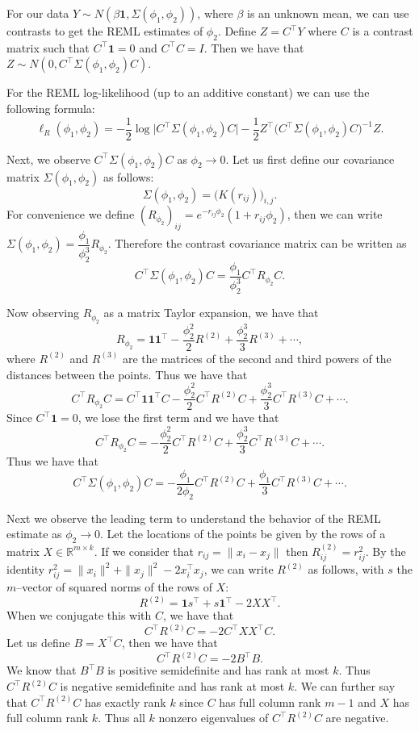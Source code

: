 \documentclass[answers,12pt,addpoints]{exam}
\begin{document}
\begin{questions}
\begin{solution}
For our data $Y \sim N(\beta \mathbf{1}, \Sigma(\phi_1, \phi_2))$,
where $\beta$ is an unknown mean, we can use contrasts to get the
REML estimates of $\phi_2$. Define $Z = C^\top Y$ where $C$ is a
contrast matrix such that $C^\top \mathbf{1} = 0$ and
$C^\top C = I$. Then we have that
$Z \sim N(0, C^\top \Sigma(\phi_1, \phi_2) C)$.

For the REML log-likelihood (up to an additive constant) we can use
the following formula:
\[
\ell_{R}(\phi_1, \phi_2)
= -\frac{1}{2} \log \bigl|C^\top \Sigma(\phi_1, \phi_2) C\bigr|
  -\frac{1}{2} Z^\top
     \bigl(C^\top \Sigma(\phi_1, \phi_2) C\bigr)^{-1} Z.
\]

Next, we observe $C^\top \Sigma(\phi_1, \phi_2) C$ as
$\phi_2 \to 0$. Let us first define our covariance matrix
$\Sigma(\phi_1, \phi_2)$ as follows:
\[
\Sigma(\phi_1, \phi_2) = \bigl( K(r_{ij}) \bigr)_{i,j}.
\]
For convenience we define
$(R_{\phi_2})_{ij} = e^{-r_{ij} \phi_2} (1+r_{ij} \phi_2)$, then we
can write $\Sigma(\phi_1, \phi_2) = \dfrac{\phi_1}{\phi_2^3} R_{\phi_2}$.
Therefore the contrast covariance matrix can be written as
\[
C^\top \Sigma(\phi_1, \phi_2) C
= \frac{\phi_1}{\phi_2^3} C^\top R_{\phi_2} C.
\]

Now observing $R_{\phi_2}$ as a matrix Taylor expansion, we have that
\[
R_{\phi_2}
= \mathbf{1}\mathbf{1}^\top
  - \frac{\phi_2^2}{2} R^{(2)}
  + \frac{\phi_2^3}{3} R^{(3)} + \cdots,
\]
where $R^{(2)}$ and $R^{(3)}$ are the matrices of the second and third
powers of the distances between the points. Thus we have that
\[
C^\top R_{\phi_2} C
= C^\top \mathbf{1}\mathbf{1}^\top C
  - \frac{\phi_2^2}{2} C^\top R^{(2)} C
  + \frac{\phi_2^3}{3} C^\top R^{(3)} C + \cdots.
\]
Since $C^\top \mathbf{1} = 0$, we lose the first term and we have that
\[
C^\top R_{\phi_2} C
= - \frac{\phi_2^2}{2} C^\top R^{(2)} C
  + \frac{\phi_2^3}{3} C^\top R^{(3)} C + \cdots.
\]
Thus we have that
\[
C^\top \Sigma(\phi_1, \phi_2) C
= - \frac{\phi_1}{2\phi_2} C^\top R^{(2)} C
  + \frac{\phi_1}{3} C^\top R^{(3)} C + \cdots.
\]

Next we observe the leading term to understand the behavior of the
REML estimate as $\phi_2 \to 0$. Let the locations of the points be
given by the rows of a matrix $X \in \mathbb{R}^{m \times k}$.
If we consider that $r_{ij} = \| x_i - x_j\|$ then
$R^{(2)}_{ij} = r_{ij}^2$. By the identity
$r_{ij}^2 = \|x_i\|^2 + \|x_j\|^2 - 2 x_i^\top x_j$, we can write
$R^{(2)}$ as follows, with $s$ the $m$–vector of squared norms of the
rows of $X$:
\[
R^{(2)} = \mathbf{1} s^\top + s \mathbf{1}^\top - 2 X X^\top.
\]
When we conjugate this with $C$, we have that
\[
C^\top R^{(2)} C
= - 2 C^\top X X^\top C.
\]
Let us define $B = X^\top C$, then we have that
\[
C^\top R^{(2)} C = - 2 B^\top B.
\]
We know that $B^\top B$ is positive semidefinite and has rank at most
$k$. Thus $C^\top R^{(2)} C$ is negative semidefinite and has rank at
most $k$. We can further say that $C^\top R^{(2)} C$ has exactly rank
$k$ since $C$ has full column rank $m-1$ and $X$ has full column rank
$k$. Thus all $k$ nonzero eigenvalues of $C^\top R^{(2)} C$ are
negative.


\end{solution}
\end{questions}
\end{document}
